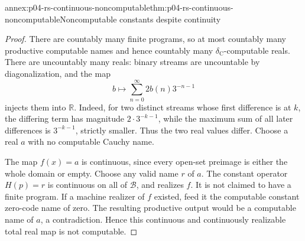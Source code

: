 \begin{annexitem}{annex:p04-rs-continuous-noncomputable}{thm:p04-rs-continuous-noncomputable}{Noncomputable constants despite continuity}
\begin{proof}
There are countably many finite programs, so at most
countably many productive computable names and hence
countably many \(\delta_{\mathrm C}\)-computable reals.
There are uncountably many reals: binary streams are
uncountable by diagonalization, and the map
\[
 b\longmapsto\sum_{n=0}^{\infty}2b(n)3^{-n-1}
\]
injects them into \(\mathbb R\).
Indeed, for two distinct streams whose first difference
is at \(k\), the differing term has magnitude
\(2\cdot3^{-k-1}\), while the maximum sum of all later
differences is \(3^{-k-1}\), strictly smaller.
Thus the two real values differ.
Choose a real \(a\) with no computable Cauchy name.

The map \(f(x)=a\) is continuous, since every open-set
preimage is either the whole domain or empty.
Choose any valid name \(r\) of \(a\).
The constant operator \(H(p)=r\) is continuous on all
of \(\mathcal B\), and realizes \(f\).
It is not claimed to have a finite program.
If a machine realizer of \(f\) existed, feed it the
computable constant zero-code name of zero.
The resulting productive output would be a computable
name of \(a\), a contradiction.
Hence this continuous and continuously realizable
total real map is not computable.
\end{proof}
\end{annexitem}

